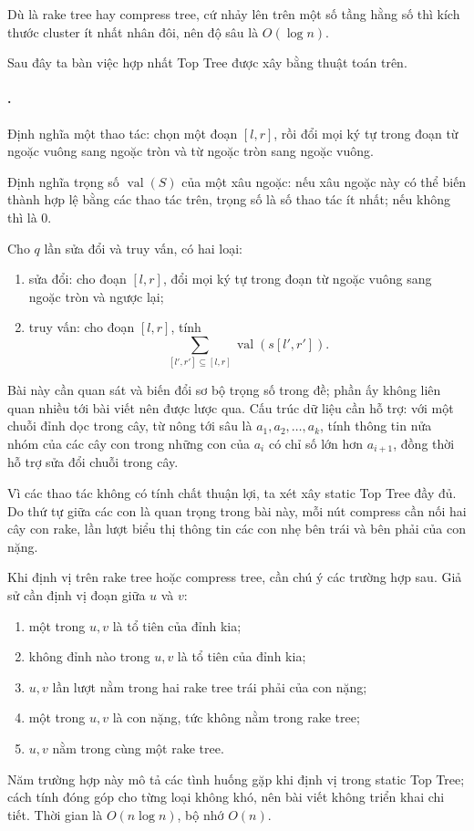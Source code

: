 \documentclass[11pt]{article}
\begin{document}
Dù là rake tree hay compress tree, cứ nhảy lên trên một số tầng hằng số thì
kích thước cluster ít nhất nhân đôi, nên độ sâu là \(O(\log n)\).

Sau đây ta bàn việc hợp nhất Top Tree được xây bằng thuật toán trên.

\paragraph{.}
Định nghĩa một thao tác: chọn một đoạn \([l,r]\), rồi đổi mọi ký tự trong đoạn
từ ngoặc vuông sang ngoặc tròn và từ ngoặc tròn sang ngoặc vuông.

Định nghĩa trọng số \(\operatorname{val}(S)\) của một xâu ngoặc: nếu xâu ngoặc
này có thể biến thành hợp lệ bằng các thao tác trên, trọng số là số thao tác ít
nhất; nếu không thì là \(0\).

Cho \(q\) lần sửa đổi và truy vấn, có hai loại:
\begin{enumerate}
  \item sửa đổi: cho đoạn \([l,r]\), đổi mọi ký tự trong đoạn từ ngoặc vuông
  sang ngoặc tròn và ngược lại;
  \item truy vấn: cho đoạn \([l,r]\), tính
  \[
    \sum_{[l',r']\subseteq [l,r]} \operatorname{val}(s[l',r']).
  \]
\end{enumerate}

Bài này cần quan sát và biến đổi sơ bộ trọng số trong đề; phần ấy không liên
quan nhiều tới bài viết nên được lược qua. Cấu trúc dữ liệu cần hỗ trợ: với một
chuỗi đỉnh dọc trong cây, từ nông tới sâu là \(a_1,a_2,\ldots,a_k\), tính thông
tin nửa nhóm của các cây con trong những con của \(a_i\) có chỉ số lớn hơn
\(a_{i+1}\), đồng thời hỗ trợ sửa đổi chuỗi trong cây.

Vì các thao tác không có tính chất thuận lợi, ta xét xây static Top Tree đầy
đủ. Do thứ tự giữa các con là quan trọng trong bài này, mỗi nút compress cần
nối hai cây con rake, lần lượt biểu thị thông tin các con nhẹ bên trái và bên
phải của con nặng.

Khi định vị trên rake tree hoặc compress tree, cần chú ý các trường hợp sau.
Giả sử cần định vị đoạn giữa \(u\) và \(v\):
\begin{enumerate}
  \item một trong \(u,v\) là tổ tiên của đỉnh kia;
  \item không đỉnh nào trong \(u,v\) là tổ tiên của đỉnh kia;
  \item \(u,v\) lần lượt nằm trong hai rake tree trái phải của con nặng;
  \item một trong \(u,v\) là con nặng, tức không nằm trong rake tree;
  \item \(u,v\) nằm trong cùng một rake tree.
\end{enumerate}
Năm trường hợp này mô tả các tình huống gặp khi định vị trong static Top Tree;
cách tính đóng góp cho từng loại không khó, nên bài viết không triển khai chi
tiết. Thời gian là \(O(n\log n)\), bộ nhớ \(O(n)\).
\end{document}
